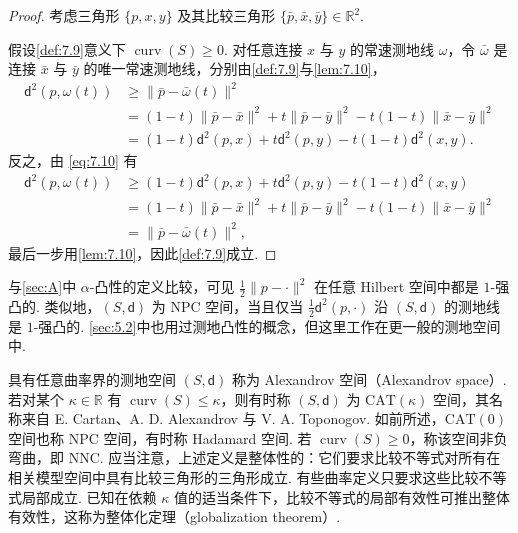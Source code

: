 \begin{proof}
考虑三角形 $\{p,x,y\}$ 及其比较三角形 $\{\bar p,\bar x,\bar y\}\in\mathbb R^2$.

假设\autoref{def:7.9}意义下 $\operatorname{curv}(S)\ge0$. 对任意连接 $x$ 与 $y$ 的常速测地线 $\omega$，令 $\bar\omega$ 是连接 $\bar x$ 与 $\bar y$ 的唯一常速测地线，分别由\autoref{def:7.9}与\autoref{lem:7.10}，
$$\begin{aligned}
\mathsf d^2(p,\omega(t))&\ge\lVert\bar p-\bar\omega(t)\rVert^2\\
&=(1-t)\lVert\bar p-\bar x\rVert^2+t\lVert\bar p-\bar y\rVert^2-t(1-t)\lVert\bar x-\bar y\rVert^2\\
&=(1-t)\mathsf d^2(p,x)+t\mathsf d^2(p,y)-t(1-t)\mathsf d^2(x,y).
\end{aligned}$$
反之，由 \eqref{eq:7.10} 有
$$\begin{aligned}
\mathsf d^2(p,\omega(t))
&\ge(1-t)\mathsf d^2(p,x)+t\mathsf d^2(p,y)-t(1-t)\mathsf d^2(x,y)\\
&=(1-t)\lVert\bar p-\bar x\rVert^2+t\lVert\bar p-\bar y\rVert^2-t(1-t)\lVert\bar x-\bar y\rVert^2\\
&=\lVert\bar p-\bar\omega(t)\rVert^2,
\end{aligned}$$
最后一步用\autoref{lem:7.10}，因此\autoref{def:7.9}成立.
\end{proof}
\begin{remark}\label{rem:7.12}
与\autoref{sec:A}中 $\alpha$-凸性的定义比较，可见 $\frac12\lVert p-\cdot\rVert^2$ 在任意 Hilbert 空间中都是 $1$-强凸的. 类似地，$(S,\mathsf d)$ 为 NPC 空间，当且仅当 $\frac12\mathsf d^2(p,\cdot)$ 沿 $(S,\mathsf d)$ 的测地线是 $1$-强凸的. \autoref{sec:5.2}中也用过测地凸性的概念，但这里工作在更一般的测地空间中.
\end{remark}
具有任意曲率界的测地空间 $(S,\mathsf d)$ 称为 Alexandrov 空间（Alexandrov space）. 若对某个 $\kappa\in\mathbb R$ 有 $\operatorname{curv}(S)\le\kappa$，则有时称 $(S,\mathsf d)$ 为 $\mathrm{CAT}(\kappa)$ 空间，其名称来自 E. Cartan、A. D. Alexandrov 与 V. A. Toponogov. 如前所述，$\mathrm{CAT}(0)$ 空间也称 NPC 空间，有时称 Hadamard 空间. 若 $\operatorname{curv}(S)\ge0$，称该空间非负弯曲，即 NNC. 应当注意，上述定义是整体性的：它们要求比较不等式对所有在相关模型空间中具有比较三角形的三角形成立. 有些曲率定义只要求这些比较不等式局部成立. 已知在依赖 $\kappa$ 值的适当条件下，比较不等式的局部有效性可推出整体有效性，这称为整体化定理（globalization theorem）.

